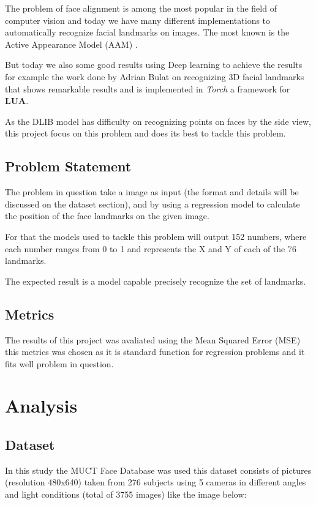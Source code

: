 \documentclass[11pt]{article}
\begin{document}
The problem of face alignment is among the most popular in the field of
computer vision and today we have many different implementations to
automatically recognize facial landmarks on images.
The most known is the Active Appearance Model (AAM)
\cite{edwards1998face,matthews2004active}.

But today we also some good results using Deep learning to achieve the
results for example the work done by Adrian Bulat on recognizing 3D facial
landmarks \cite{bulat2017far} that shows remarkable results and is implemented
in \emph{Torch} a framework for \textbf{LUA}. 

As the DLIB model has difficulty on recognizing points on faces by the side
view, this project focus on this problem and does its best to tackle this
problem.

\subsection{Problem Statement}
\label{sec:orgd6a46cc}

The problem in question take a image as input (the format and details will be
discussed on the dataset section), and by using a regression model to
calculate the position of the face landmarks on the given image.

For that the models used to tackle this problem will output 152 numbers, where
each number ranges from 0 to 1 and represents the X and Y of each of the 76
landmarks. 

The expected result is a model capable precisely recognize the set of
landmarks.


\subsection{Metrics}
\label{sec:orgfa6d0b9}

The results of this project was avaliated using the Mean Squared Error (MSE) 
this metrics was chosen as it is standard function for regression problems
and it fits well problem in question. 

\section{Analysis}
\label{sec:orga8c8fbe}

\subsection{Dataset}
\label{sec:org2d8f80a}
In this study the MUCT Face Database \cite{Milborrow10} was used
this dataset consists of pictures (resolution 480x640) taken from 276 subjects
using 5 cameras in different angles and light conditions (total of 3755
images) like the image below: 
\end{document}
